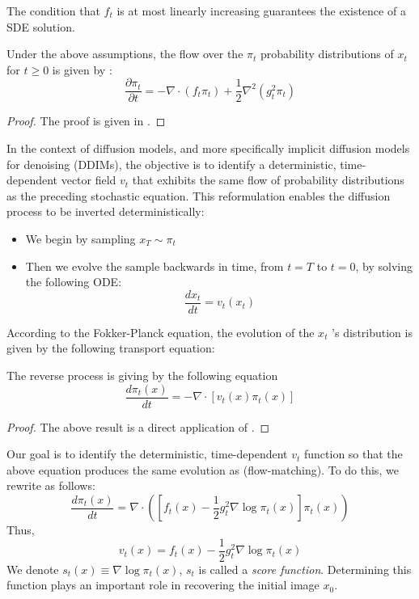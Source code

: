 \documentclass[a4paper,10pt]{article}
\begin{document}
    \begin{remark}
        The condition that $f_t$ is at most linearly increasing guarantees the existence of a SDE solution.
    \end{remark}

\begin{proposition} 
    Under the above assumptions, the flow over the $\pi_t$ probability distributions of $x_t$ for $t \geq 0$ is given by :    \begin{equation}\label{eq:Fokker-Planck}
        \frac{\partial\pi_t}{\partial t} = -\nabla \cdot (f_t \pi_t) + \frac{1}{2}\nabla^2(g_t^2\pi_t)
    \end{equation}
\end{proposition}
\begin{proof}
    The proof is given in .
\end{proof}
In the context of diffusion models, and more specifically implicit diffusion models for denoising (DDIMs), the objective is to identify a deterministic, time-dependent vector field $v_t$ that exhibits the same flow of probability distributions as the preceding stochastic equation. This reformulation enables the diffusion process to be inverted deterministically:
\begin{itemize}
    \item We begin by sampling $x_T \sim \pi_t$
    \item Then we evolve the sample backwards in time, from $t=T$ to $t = 0$, by solving the following ODE:
    \begin{equation}
        \frac{dx_t}{dt} = v_t(x_t)
    \end{equation}
\end{itemize}
According to the Fokker-Planck equation, the evolution of the $x_t$ 's distribution is given by the following transport equation:
\begin{proposition} 
The reverse process is giving by the following equation
\[\frac{d\pi_t(x)}{dt} =-\nabla \cdot [v_t(x)\pi_t(x)]\]
\end{proposition}
\begin{proof}
    The above result is a direct application of .
\end{proof}
Our goal is to identify the deterministic, time-dependent $v_t$ function so that the above equation produces the same evolution as  (flow-matching). To do this, we rewrite  as follows:
\[\frac{d\pi_t(x)}{dt} =\nabla \cdot([f_t(x)-\frac{1}{2}g_t^2\nabla \log\pi_t(x)]\pi_t(x))\]
Thus,
\[v_t(x) =f_t(x)-\frac{1}{2}g_t^2\nabla \log\pi_t(x) \]
We denote $s_t(x) \equiv \nabla \log\pi_t(x)$, $s_t$ is called a \emph{score function}. Determining this function plays an important role in recovering the initial image $x_0$.
\end{document}
